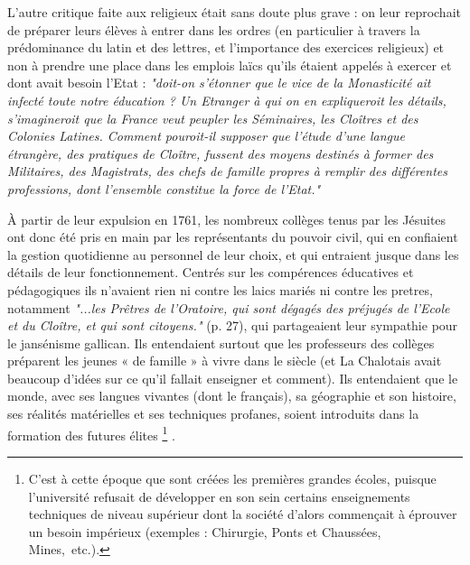  L'autre critique faite aux religieux était sans doute plus grave : on leur reprochait de préparer leurs élèves à entrer dans les ordres (en particulier à travers la prédominance du latin et des lettres, et l'importance des exercices religieux) et non à prendre une place dans les emplois laïcs qu'ils étaient appelés à exercer et dont avait besoin l'Etat : \emph{"doit-on s'étonner que le vice de la Monasticité ait infecté toute notre éducation ? Un Etranger à qui on en expliqueroit les détails, s'imagineroit que la France veut peupler les Séminaires, les Cloîtres et des Colonies Latines. Comment pouroit-il supposer que l'étude d'une langue étrangère, des pratiques de Cloître, fussent des moyens destinés à former des Militaires, des Magistrats, des chefs de famille propres à remplir des différentes professions, dont l'ensemble constitue la force de l'Etat."}
 
 À partir de leur expulsion en 1761, les nombreux collèges tenus par les Jésuites ont donc été pris en main par les représentants du pouvoir civil, qui en confiaient la gestion quotidienne au personnel de leur choix, et qui entraient jusque dans les détails de leur fonctionnement. Centrés sur les compérences éducatives et pédagogiques ils n'avaient rien ni contre les laics mariés ni contre les pretres, notamment \emph{"...les Prêtres de l'Oratoire, qui sont dégagés des préjugés de l'Ecole et du Cloître, et qui sont citoyens."} (p. 27), qui partageaient leur sympathie pour le jansénisme gallican. Ils entendaient surtout que les professeurs des collèges préparent les jeunes « de famille » à vivre dans le siècle (et La Chalotais avait beaucoup d'idées sur ce qu'il fallait enseigner et comment). Ils entendaient que le monde, avec ses langues vivantes (dont le français), sa géographie et son histoire, ses réalités matérielles et ses techniques profanes, soient introduits dans la formation des futures élites%
\footnote{C'est à cette époque que sont créées les premières grandes écoles, puisque l'université refusait de développer en son sein certains enseignements techniques de niveau supérieur dont la société d'alors commençait à éprouver un besoin impérieux (exemples : Chirurgie, Ponts et Chaussées, Mines,~etc.).}%
.


